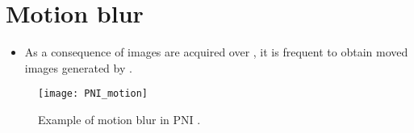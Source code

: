 \section{Motion blur}
\begin{itemize}
\item As a consequence of images are acquired over , it is frequent to obtain
  moved images generated by .
\end{itemize}
\vspace{-4ex}
\begin{figure}[!b]
  \centering
  \texttt{[image: PNI\_motion]}
  \caption{Example of motion blur in \gls{PNI}
    \cite{naddaf2004technical}.}
  \label{PNI_motion}
\end{figure}
